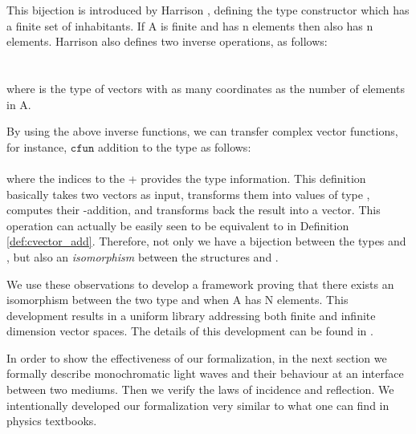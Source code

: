 \documentclass{llncs}
\begin{document}
{		This bijection is introduced by Harrison \cite{harrison_13hol}, defining the type
		constructor  which has a finite
		set of inhabitants. If \hol A is finite and has
		\hol n elements then  also has \hol n elements.
		Harrison also defines two inverse operations, as follows:\vspace{.2cm}\\
		 \vspace{.1cm}\\
		\vspace{.2cm}\\
    where  is the type of vectors with as many coordinates as the number of elements in \hol A. 
		
		By using the above inverse functions, we can transfer complex vector functions, for instance, ${\mathtt{cfun}}$ addition
		to the type  as follows: \vspace{.2cm}\\
    \vspace{.2cm}\\
    \noindent where the indices to the \hol + provides the type information. 
		This definition basically takes two vectors as input, transforms them into values
		of type , computes their -addition, and transforms back
		the result into a vector.
		This operation can actually be easily seen to be equivalent to  in Definition \ref{def:cvector_add}.
		Therefore, not only we have a bijection between
		the types  and ,
		but also an \emph{isomorphism} between the structures
		 and .
		

We use these observations to develop a framework proving that there exists an isomorphism between the two type  and  when \hol A has \hol N elements. This development results in a uniform library addressing both finite and infinite dimension vector spaces. The details of this development can be found in \cite{report_MCS}. 




In order to show the effectiveness of our formalization, in the next section we formally describe monochromatic light waves and their behaviour at an interface between two mediums. Then we verify the laws of incidence and reflection. We intentionally developed our formalization very similar to what one can find in physics textbooks. 

}
\end{document}

